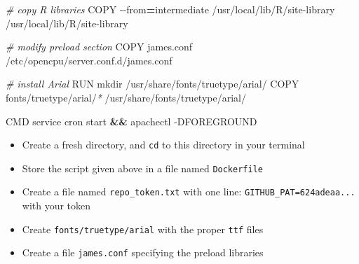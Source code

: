 \documentclass[
]{book}
\newenvironment{Shaded}{\begin{snugshade}}{\end{snugshade}}
\newcommand{\AttributeTok}[1]{\textcolor[rgb]{0.77,0.63,0.00}{#1}}
\newcommand{\CommentTok}[1]{\textcolor[rgb]{0.56,0.35,0.01}{\textit{#1}}}
\newcommand{\ExtensionTok}[1]{#1}
\newcommand{\KeywordTok}[1]{\textcolor[rgb]{0.13,0.29,0.53}{\textbf{#1}}}
\newcommand{\NormalTok}[1]{#1}
\newcommand{\OperatorTok}[1]{\textcolor[rgb]{0.81,0.36,0.00}{\textbf{#1}}}
\newcommand{\PreprocessorTok}[1]{\textcolor[rgb]{0.56,0.35,0.01}{\textit{#1}}}
\providecommand{\tightlist}{%
  \setlength{\itemsep}{0pt}\setlength{\parskip}{0pt}}
\begin{document}
\begin{Shaded}
\begin{Highlighting}[]
\CommentTok{\# copy R libraries}
\ExtensionTok{COPY} \AttributeTok{{-}{-}from}\OperatorTok{=}\NormalTok{intermediate /usr/local/lib/R/site{-}library /usr/local/lib/R/site{-}library}

\CommentTok{\# modify preload section}
\ExtensionTok{COPY}\NormalTok{ james.conf /etc/opencpu/server.conf.d/james.conf}

\CommentTok{\# install Arial}
\ExtensionTok{RUN}\NormalTok{ mkdir /usr/share/fonts/truetype/arial/}
\ExtensionTok{COPY}\NormalTok{ fonts/truetype/arial/}\PreprocessorTok{*}\NormalTok{ /usr/share/fonts/truetype/arial/}

\ExtensionTok{CMD}\NormalTok{ service cron start }\KeywordTok{\&\&} \ExtensionTok{apachectl} \AttributeTok{{-}DFOREGROUND}
\end{Highlighting}
\end{Shaded}

\begin{itemize}
\tightlist
\item
  Create a fresh directory, and \texttt{cd} to this directory in your terminal
\item
  Store the script given above in a file named \texttt{Dockerfile}
\item
  Create a file named \texttt{repo\_token.txt} with one line: \texttt{GITHUB\_PAT=624adeaa...} with your token
\item
  Create \texttt{fonts/truetype/arial} with the proper \texttt{ttf} files
\item
  Create a file \texttt{james.conf} specifying the preload libraries
\end{itemize}
\end{document}

